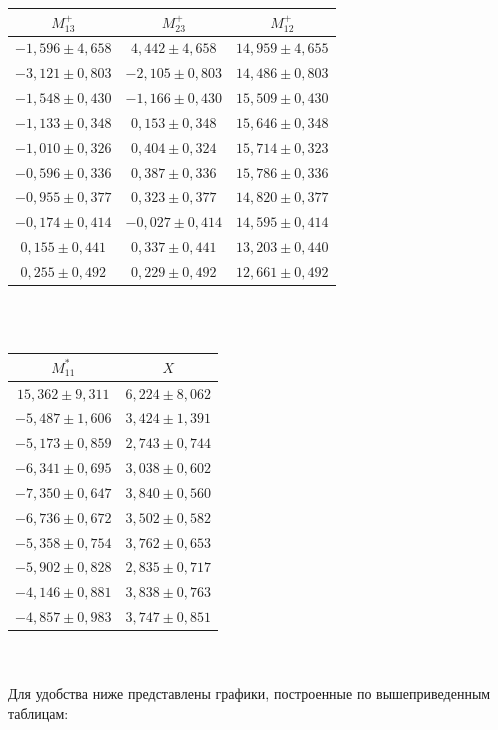 \documentclass[14pt]{article} %
\begin{document}
\begin{tabular}{|c|c|c|}
\hline
$M_{13}^+$&$M_{23}^+$&$M_{12}^+$\\
\hline
$-1,596	\pm	4,658	$&$	4,442	\pm	4,658	$&$	14,959	\pm	4,655	$\\
$-3,121	\pm	0,803	$&$	-2,105	\pm	0,803	$&$	14,486	\pm	0,803	$\\
$-1,548	\pm	0,430	$&$	-1,166	\pm	0,430	$&$	15,509	\pm	0,430	$\\
$-1,133	\pm	0,348	$&$	0,153	\pm	0,348	$&$	15,646	\pm	0,348	$\\
$-1,010	\pm	0,326	$&$	0,404	\pm	0,324	$&$	15,714	\pm	0,323	$\\
$-0,596	\pm	0,336	$&$	0,387	\pm	0,336	$&$	15,786	\pm	0,336	$\\
$-0,955	\pm	0,377	$&$	0,323	\pm	0,377	$&$	14,820	\pm	0,377	$\\
$-0,174	\pm	0,414	$&$	-0,027	\pm	0,414	$&$	14,595	\pm	0,414	$\\
$0,155	\pm	0,441	$&$	0,337	\pm	0,441	$&$	13,203	\pm	0,440	$\\
$0,255	\pm	0,492	$&$	0,229	\pm	0,492	$&$	12,661	\pm	0,492	$\\
\hline
\end{tabular}\\\\
\begin{tabular}{|c|c|}
\hline
$M_{11}^*$&$X$\\
\hline
$	15,362	\pm	9,311	$&$	6,224	\pm	8,062$\\
$	-5,487	\pm	1,606	$&$	3,424	\pm	1,391$\\
$	-5,173	\pm	0,859	$&$	2,743	\pm	0,744$\\
$	-6,341	\pm	0,695	$&$	3,038	\pm	0,602$\\
$	-7,350	\pm	0,647	$&$	3,840	\pm	0,560$\\
$	-6,736	\pm	0,672	$&$	3,502	\pm	0,582$\\
$	-5,358	\pm	0,754	$&$	3,762	\pm	0,653$\\
$	-5,902	\pm	0,828	$&$	2,835	\pm	0,717$\\
$	-4,146	\pm	0,881	$&$	3,838	\pm	0,763$\\
$	-4,857	\pm	0,983	$&$	3,747	\pm	0,851$\\
\hline
\end{tabular}\\\\
Для удобства ниже представлены графики, построенные по вышеприведенным таблицам:\newpage
\end{document}
